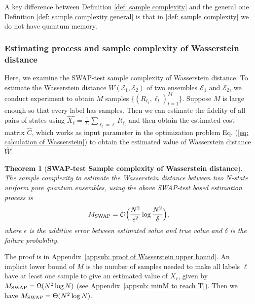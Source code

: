 \documentclass[aps,prx,reprint,superscriptaddress,amsmath,amssymb,longbibliography,floatfix]{revtex4-2}
\newcommand{\scE}{\mathcal{E}}
\newcommand{\scO}{\mathcal{O}}
\theoremstyle{plain}
\newtheorem{theorem}{Theorem}[section]
\theoremstyle{definition}
\theoremstyle{remark}
\begin{document}
A key difference between Definition \ref{def: sample complexity} and the general one Definition \ref{def: sample complexity general} is that in \ref{def: sample complexity} we do not have quantum memory.


\subsubsection{Estimating process and sample complexity of Wasserstein distance}\label{secsub: sc of Wass}
Here, we examine the SWAP-test sample complexity of Wasserstein distance. To estimate the Wasserstein distance $W(\scE_1,\scE_2)$ of two ensembles $\scE_1$ and $\scE_2$, we conduct experiment to obtain $M$ samples $\{(R_{\ell_t},\ell_t)_{t=1}^M\}$. Suppose $M$ is large enough so that every label has samples. Then we can estimate the fidelity of all pairs of states using $\widehat{X_{\ell}}=\frac{1}{T_{\ell}}\sum_{\ell_t=\ell}R_{\ell_t}$ and then obtain the estimated cost matrix $\widehat{C}$, which works as input parameter in the optimization problem Eq. (\ref{eq: calculation of Wasserstein}) to obtain the estimated value of Wasserstein distance $\widehat{W}$.
\begin{theorem}[\textbf{SWAP-test Sample complexity of Wasserstein distance}]
The sample complexity to estimate the Wasserstein distance between two $N$-state uniform pure quantum ensembles, using the above SWAP-test based estimation process is
    \begin{equation}
        M_{\rm SWAP}=\scO\Big(\frac{N^2}{\epsilon^2}\log\frac{N^2}{\delta}\Big), \label{eq: sample compelxity wasserstein}
    \end{equation}
    where $\epsilon$ is the additive error between estimated value and true value and $\delta$ is the failure probability.\label{thm: sample complexity Wasserstein}
\end{theorem}
The proof is in Appendix~\ref{appsub: proof of Wasserstein upper bound}. An implicit lower bound of $M$ is the number of samples needed to make all labels $\ell$ have at least one sample to give an estimated value of $X_\ell$, given by $M_{\rm SWAP}=\Omega(N^2\log N)$ (see Appendix~\ref{appsub: minM to reach T}). Then we have $M_{\rm SWAP}=\Theta(N^2 \log N)$.
\end{document}
